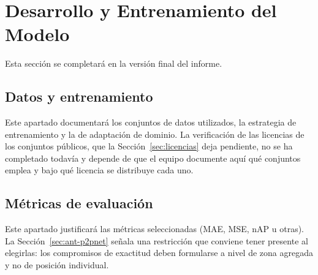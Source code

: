 %
%
\section{Desarrollo y Entrenamiento del Modelo}
\label{sec:desarrollo}

Esta sección se completará en la versión final del informe.

\subsection{Datos y entrenamiento}
\label{sec:datos-entrenamiento}

Este apartado documentará los conjuntos de datos utilizados, la
estrategia de entrenamiento y la de adaptación de dominio. La
verificación de las licencias de los conjuntos públicos, que la
Sección~\ref{sec:licencias} deja pendiente, no se ha completado todavía
y depende de que el equipo documente aquí qué conjuntos emplea y bajo qué
licencia se distribuye cada uno.

\subsection{Métricas de evaluación}
\label{sec:metricas}

Este apartado justificará las métricas seleccionadas (MAE, MSE, nAP u
otras). La Sección~\ref{sec:ant-p2pnet} señala una restricción que
conviene tener presente al elegirlas: los compromisos de exactitud deben
formularse a nivel de zona agregada y no de posición individual.
